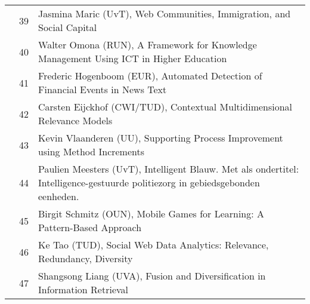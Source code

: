 \begin{longtabu}{@{}l@{ }l@{\hspace{1em}}X}
	&	 39	&	 Jasmina Maric (UvT), 	Web Communities, Immigration, and Social Capital\\
	&	 40	&	 Walter Omona (RUN), 	A Framework for Knowledge Management Using ICT in Higher Education\\
	&	 41	&	 Frederic Hogenboom (EUR), 	Automated Detection of Financial Events in News Text\\
	&	 42	&	 Carsten Eijckhof (CWI/TUD), 	Contextual Multidimensional Relevance Models\\
	&	 43	&	 Kevin Vlaanderen (UU), 	Supporting Process Improvement using Method Increments\\
	&	 44	&	 Paulien Meesters (UvT), 	Intelligent Blauw. Met als ondertitel: Intelligence-gestuurde politiezorg in gebiedsgebonden eenheden.\\
	&	 45	&	 Birgit Schmitz (OUN), 	Mobile Games for Learning: A Pattern-Based Approach\\
	&	 46	&	 Ke Tao (TUD), 	Social Web Data Analytics: Relevance, Redundancy, Diversity\\
	&	 47	&	 Shangsong Liang (UVA), 	Fusion and Diversification in Information Retrieval\\


\end{longtabu}
